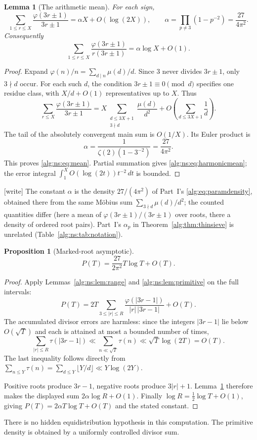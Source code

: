 \documentclass[11pt]{article}
\numberwithin{equation}{section}
\theoremstyle{plain}
\newtheorem{proposition}[proposition]{Proposition}
\theoremstyle{plain}
\newtheorem{lemma}[lemma]{Lemma}
\theoremstyle{plain}
\theoremstyle{definition}
\theoremstyle{definition}
\theoremstyle{definition}
\theoremstyle{remark}
\newcommand{\wtag}{\textup{[write]}}%
\begin{document}
\begin{lemma}[The arithmetic mean]\label{alg:ns:lem:mean}
For each sign,
\begin{equation}\label{alg:ns:eq:mean}
\sum_{1\le r\le X}\frac{\varphi(3r\pm1)}{3r\pm1}
=\alpha X+O(\log(2X)),
\qquad
\alpha=\prod_{p\ne3}(1-p^{-2})=\frac{27}{4\pi^2}.
\end{equation}
Consequently
\begin{equation}\label{alg:ns:eq:harmonicmean}
\sum_{1\le r\le X}\frac{\varphi(3r\pm1)}{r(3r\pm1)}
=\alpha\log X+O(1).
\end{equation}
\end{lemma}
\begin{proof}
Expand $\varphi(n)/n=\sum_{d\mid n}\mu(d)/d$. Since $3$ never divides
$3r\pm1$, only $3\nmid d$ occur. For each such $d$, the condition
$3r\pm1\equiv0\pmod d$ specifies one residue class, with
$X/d+O(1)$ representatives up to $X$. Thus
\[
\sum_{r\le X}\frac{\varphi(3r\pm1)}{3r\pm1}
=X\!\sum_{\substack{d\le3X+1\\3\nmid d}}\frac{\mu(d)}{d^2}
+O\!\left(\sum_{d\le3X+1}\frac1d\right).
\]
The tail of the absolutely convergent main sum is $O(1/X)$.
Its Euler product is
\[
\alpha=\frac{1}{\zeta(2)(1-3^{-2})}=\frac{27}{4\pi^2}.
\]
This proves \eqref{alg:ns:eq:mean}. Partial summation gives
\eqref{alg:ns:eq:harmonicmean}; the error integral
$\int_1^X O(\log(2t))t^{-2}\,dt$ is bounded.
\end{proof}
\wtag{} The constant $\alpha$ is the density $27/(4\pi^2)$ of Part~I's
\eqref{alg:eq:paramdensity}, obtained there from the same M\"obius sum
$\sum_{3\nmid d}\mu(d)/d^2$; the counted quantities differ (here a mean
of $\varphi(3r\pm1)/(3r\pm1)$ over roots, there a density of ordered
root pairs). Part~I's $\alpha_p$ in Theorem~\ref{alg:thm:thinsieve}
is unrelated (Table~\ref{alg:ns:tab:notation}).

\begin{proposition}[Marked-root asymptotic]\label{alg:ns:prop:P}
\begin{equation}\label{alg:ns:eq:P}
P(T)=\frac{27}{2\pi^2}T\log T+O(T).
\end{equation}
\end{proposition}
\begin{proof}
Apply Lemmas~\ref{alg:ns:lem:range} and \ref{alg:ns:lem:primitive} on the full intervals:
\[
P(T)=2T\!\sum_{3\le|r|\le R}
\frac{\varphi(|3r-1|)}{|r|\,|3r-1|}+O(T).
\]
The accumulated divisor errors are harmless: since the integers
$|3r-1|$ lie below $O(\sqrt T)$ and each is attained at most a bounded
number of times,
\[
\sum_{|r|\le R}\tau(|3r-1|)
\ll\sum_{n\ll\sqrt T}\tau(n)
\ll\sqrt T\log(2T)=O(T).
\]
The last inequality follows directly from
$\sum_{n\le Y}\tau(n)=\sum_{d\le Y}\lfloor Y/d\rfloor\ll Y\log(2Y)$.

Positive roots produce $3r-1$, negative roots produce $3|r|+1$.
Lemma~\ref{alg:ns:lem:mean} therefore makes the displayed sum
$2\alpha\log R+O(1)$. Finally $\log R=\tfrac12\log T+O(1)$, giving
$P(T)=2\alpha T\log T+O(T)$ and the stated constant.
\end{proof}
There is no hidden equidistribution hypothesis in this computation. The
primitive density is obtained by a uniformly controlled divisor sum.
\end{document}
